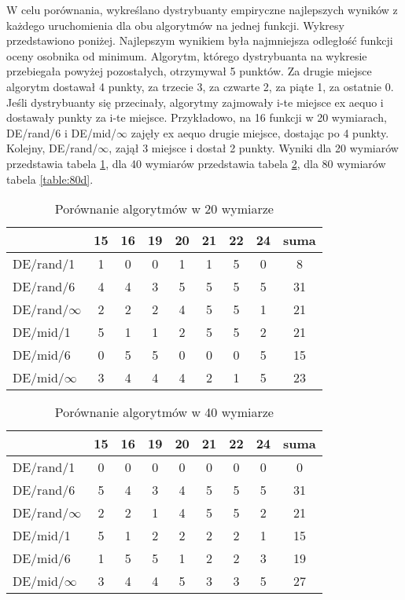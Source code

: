 \documentclass[12pt, a4paper]{article}
\begin{document}
W celu porównania, wykreślano dystrybuanty empiryczne najlepszych wyników z każdego uruchomienia 
dla obu algorytmów na jednej funkcji. Wykresy przedstawiono poniżej.
Najlepszym wynikiem była najmniejsza odległość funkcji oceny osobnika od minimum.
Algorytm, którego dystrybuanta na wykresie przebiegała powyżej pozostałych, otrzymywał 5 punktów. 
Za drugie miejsce algorytm dostawał 4 punkty, za trzecie 3, za czwarte 2, za piąte 1, za ostatnie 0. 
Jeśli dystrybuanty się przecinały, algorytmy zajmowały i-te miejsce ex aequo i dostawały punkty za i-te miejsce.
Przykładowo, na 16 funkcji w 20 wymiarach, DE/rand/6 i DE/mid/$\infty$ zajęły ex aequo drugie miejsce, dostając po 4 punkty.
Kolejny, DE/rand/$\infty$, zajął 3 miejsce i dostał 2 punkty.
Wyniki dla 20 wymiarów przedstawia tabela \ref{table:20d}, dla 40 wymiarów przedstawia tabela \ref{table:40d},
dla 80 wymiarów tabela \ref{table:80d}. \\ 

\begin{table}[H]
\centering
\begin{tabular}{ l | c | c | c | c | c | c | c | c}
                 & 15 & 16 & 19 & 20 & 21 & 22 & 24 & suma \\ \hline
DE/rand/1        & 1  & 0  & 0  & 1  & 1  & 5  & 0  & 8    \\ 
DE/rand/6        & 4  & 4  & 3  & 5  & 5  & 5  & 5  & 31   \\ 
DE/rand/$\infty$ & 2  & 2  & 2  & 4  & 5  & 5  & 1  & 21   \\ 
DE/mid/1         & 5  & 1  & 1  & 2  & 5  & 5  & 2  & 21   \\
DE/mid/6         & 0  & 5  & 5  & 0  & 0  & 0  & 5  & 15   \\ 
DE/mid/$\infty$  & 3  & 4  & 4  & 4  & 2  & 1  & 5  & 23   \\
\end{tabular}
\caption{Porównanie algorytmów w 20 wymiarze}
\label{table:20d}
\end{table}

\begin{table}[H]
\centering
\begin{tabular}{ l | c | c | c | c | c | c | c | c}
                 & 15 & 16 & 19 & 20 & 21 & 22 & 24 & suma \\ \hline
DE/rand/1        & 0  & 0  & 0  & 0  & 0  & 0  & 0  & 0    \\ 
DE/rand/6        & 5  & 4  & 3  & 4  & 5  & 5  & 5  & 31   \\ 
DE/rand/$\infty$ & 2  & 2  & 1  & 4  & 5  & 5  & 2  & 21   \\ 
DE/mid/1         & 5  & 1  & 2  & 2  & 2  & 2  & 1  & 15   \\
DE/mid/6         & 1  & 5  & 5  & 1  & 2  & 2  & 3  & 19   \\ 
DE/mid/$\infty$  & 3  & 4  & 4  & 5  & 3  & 3  & 5  & 27   \\
\end{tabular}
\caption{Porównanie algorytmów w 40 wymiarze}
\label{table:40d}
\end{table}
\end{document}
